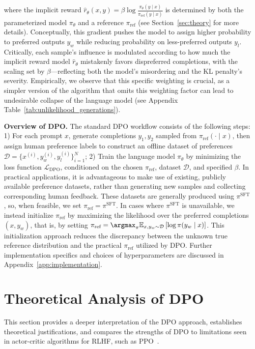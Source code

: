 where the implicit reward $\hat{r}_\theta(x, y) = \beta \log \frac{\pi_\theta(y \mid x)}{\pi_\text{ref}(y \mid x)}$ is determined by both the parameterized model $\pi_\theta$ and a reference $\pi_\text{ref}$ (see Section~\ref{sec:theory} for more details). Conceptually, this gradient pushes the model to assign higher probability to preferred outputs $y_w$ while reducing probability on less-preferred outputs $y_l$. Critically, each sample's influence is modulated according to how much the implicit reward model $\hat{r}_\theta$ mistakenly favors dispreferred completions, with the scaling set by $\beta$—reflecting both the model's misordering and the KL penalty's severity. Empirically, we observe that this specific weighting is crucial, as a simpler version of the algorithm that omits this weighting factor can lead to undesirable collapse of the language model (see Appendix Table~\ref{tab:unlikelihood_generations}).

\textbf{Overview of DPO.} The standard DPO workflow consists of the following steps: 1) For each prompt $x$, generate completions $y_1, y_2$ sampled from $\pi_\text{ref}(\cdot \mid x)$, then assign human preference labels to construct an offline dataset of preferences $\mathcal{D} = \{x^{(i)}, y_w^{(i)}, y_l^{(i)}\}_{i=1}^N$; 2) Train the language model $\pi_\theta$ by minimizing the loss function $\mathcal{L}_\text{DPO}$, conditioned on the chosen $\pi_\text{ref}$, dataset $\mathcal{D}$, and specified $\beta$. In practical applications, it is advantageous to make use of existing, publicly available preference datasets, rather than generating new samples and collecting corresponding human feedback. These datasets are generally produced using $\pi^\text{SFT}$, so, when feasible, we set $\pi_\text{ref} = \pi^\text{SFT}$. In cases where $\pi^\text{SFT}$ is unavailable, we instead initialize $\pi_\text{ref}$ by maximizing the likelihood over the preferred completions ${(x, y_w)}$, that is, by setting ${\pi_\text{ref} = \argmax_{\pi}\mathbb{E}_{x, y_w \sim \mathcal{D}}\left[\log \pi(y_w \mid x)\right]}$. This initialization approach reduces the discrepancy between the unknown true reference distribution and the practical $\pi_\text{ref}$ utilized by DPO. Further implementation specifics and choices of hyperparameters are discussed in Appendix~\ref{app:implementation}.

\section{Theoretical Analysis of DPO} This section provides a deeper interpretation of the DPO approach, establishes theoretical justifications, and compares the strengths of DPO to limitations seen in actor-critic algorithms for RLHF, such as PPO~\cite{schulman2017proximal}.

